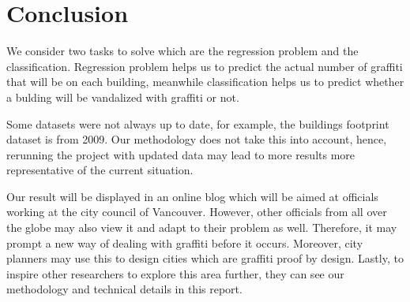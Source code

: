\chapter{Conclusion}

We consider two tasks to solve which are the regression problem and the classification. Regression problem helps us to predict the actual number of graffiti that will be on each building, meanwhile classification helps us to predict whether a bulding will be vandalized with graffiti or not.



Some datasets were not always up to date, for example, the buildings footprint dataset is from 2009. Our methodology does not take this into account, hence, rerunning the project with updated data may lead to more results more representative of the current situation.

Our result will be displayed in an online blog which will be aimed at officials working at the city council of Vancouver.
However, other officials from all over the globe may also view it and adapt to their problem as well.
Therefore, it may prompt a new way of dealing with graffiti before it occurs.
Moreover, city planners may use this to design cities which are graffiti proof by design.
Lastly, to inspire other researchers to explore this area further, they can see our methodology and technical details in this report.